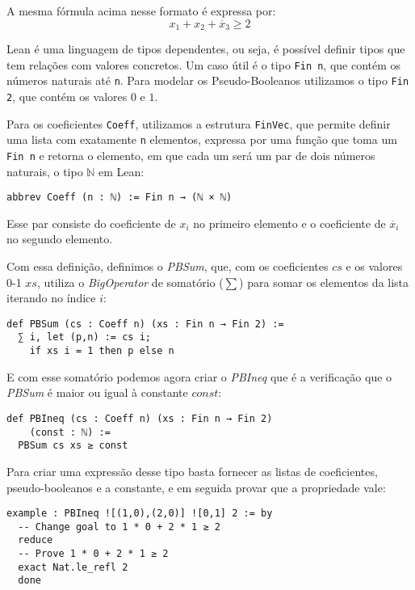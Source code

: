 \documentclass[conference]{IEEEtran}
\begin{document}
A mesma fórmula acima nesse formato é expressa por:
\begin{equation}
    x_1 + x_2 + \overline x_3 \ge 2
\end{equation}

Lean é uma linguagem de tipos dependentes, ou seja, é possível definir tipos que tem relações com valores concretos.
Um caso útil é o tipo \texttt{Fin n}, que contém os números naturais até \texttt{n}.
Para modelar os Pseudo-Booleanos utilizamos o tipo \texttt{Fin 2}, que contém os valores $0$ e $1$.

Para os coeficientes \texttt{Coeff}, utilizamos a estrutura \texttt{FinVec},
que permite definir uma lista com exatamente \texttt{n} elementos,
expressa por uma função que toma um \texttt{Fin n} e retorna o elemento,
em que cada um será um par de dois números naturais, o tipo $\mathbb{N}$ em Lean:
\begin{verbatim}
abbrev Coeff (n : ℕ) := Fin n → (ℕ × ℕ)
\end{verbatim}

Esse par consiste do coeficiente de $x_i$ no primeiro elemento e
o coeficiente de $\overline x_i$ no segundo elemento.

Com essa definição, definimos o \textit{PBSum}, que, com os coeficientes $cs$ e os valores 0-1 $xs$,
utiliza o \textit{BigOperator} de somatório ($\sum$) para somar os elementos da lista iterando no índice $i$:
\begin{verbatim}
def PBSum (cs : Coeff n) (xs : Fin n → Fin 2) :=
  ∑ i, let (p,n) := cs i;
    if xs i = 1 then p else n
\end{verbatim}

E com esse somatório podemos agora criar o \textit{PBIneq} que é a verificação que o \textit{PBSum}
é maior ou igual à constante $const$:
\begin{verbatim}
def PBIneq (cs : Coeff n) (xs : Fin n → Fin 2)
    (const : ℕ) :=
  PBSum cs xs ≥ const
\end{verbatim}

Para criar uma expressão desse tipo basta fornecer as listas de coeficientes, pseudo-booleanos e a constante,
e em seguida provar que a propriedade vale:
\\
\begin{verbatim}
example : PBIneq ![(1,0),(2,0)] ![0,1] 2 := by
  -- Change goal to 1 * 0 + 2 * 1 ≥ 2
  reduce               
  -- Prove 1 * 0 + 2 * 1 ≥ 2
  exact Nat.le_refl 2  
  done
\end{verbatim}
\end{document}
